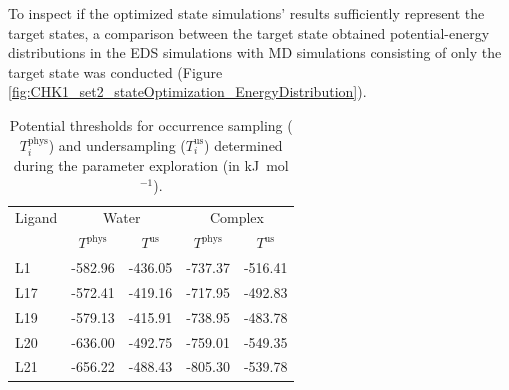 To inspect if the optimized state simulations' results sufficiently represent the target states, a comparison between the target state obtained potential-energy distributions in the EDS simulations with MD simulations consisting of only the target state was conducted (Figure \ref{fig:CHK1_set2_stateOptimization_EnergyDistribution}). 


\begin{table}[H]
\centering
\caption{Potential thresholds for occurrence sampling ($T_{i}^{\text{phys}}$) and undersampling ($T_{i}^{\text{us}}$) determined during the parameter exploration (in kJ~mol$^{-1}$).}
\label{SItab:RingCycleOpenin_PotentialTresholds}
\begin{adjustbox}{max width=\textwidth}
\begin{tabular}{ l | c c |c c| }
 Ligand &\multicolumn{2}{c|}{Water} & \multicolumn{2}{c|}{Complex}\\ 
  & \multicolumn{1}{c}{$T^{\text{phys}}$}& \multicolumn{1}{c|}{$T^{\text{us}}$}&  \multicolumn{1}{c}{$T^{\text{phys}}$}& \multicolumn{1}{c|}{$T^{\text{us}}$} \\ 
 \hline
     L1  & -582.96 & -436.05 & -737.37 & -516.41\\ 
     L17 & -572.41 & -419.16 & -717.95 & -492.83\\
     L19 & -579.13 & -415.91 & -738.95 & -483.78\\
     L20 & -636.00 & -492.75 & -759.01 & -549.35\\
     L21 & -656.22 & -488.43 & -805.30 & -539.78\\
\end{tabular}
\end{adjustbox}
\end{table}


